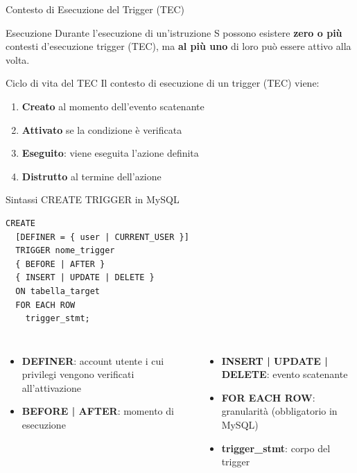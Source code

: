 \documentclass[aspectratio=169]{beamer}
\begin{document}
\begin{frame}{Contesto di Esecuzione del Trigger (TEC)}
  \begin{block}{Esecuzione}
    Durante l'esecuzione di un'istruzione S possono esistere \textbf{zero o più}
    contesti d'esecuzione trigger (TEC), ma \textbf{al più uno} di loro può
    essere attivo alla volta.
  \end{block}
  \vspace{0.3cm}
  \begin{block}{Ciclo di vita del TEC}
    Il contesto di esecuzione di un trigger (TEC) viene:
    \begin{enumerate}
      \item \textbf{Creato} al momento dell'evento scatenante
      \item \textbf{Attivato} se la condizione è verificata
      \item \textbf{Eseguito}: viene eseguita l'azione definita
      \item \textbf{Distrutto} al termine dell'azione
    \end{enumerate}
  \end{block}
\end{frame}

\begin{frame}[fragile]{Sintassi CREATE TRIGGER in MySQL}
  \begin{lstlisting}[style=sqlstyle]
CREATE
  [DEFINER = { user | CURRENT_USER }]
  TRIGGER nome_trigger
  { BEFORE | AFTER }
  { INSERT | UPDATE | DELETE }
  ON tabella_target
  FOR EACH ROW
    trigger_stmt;
  \end{lstlisting}
  \vspace{0.2cm}
  \begin{columns}[T]
      \begin{itemize}
        \item \textbf{DEFINER}: account utente i cui privilegi vengono
              verificati all'attivazione
        \item \textbf{BEFORE | AFTER}: momento di esecuzione
      \end{itemize}
      \begin{itemize}
        \item \textbf{INSERT | UPDATE | DELETE}: evento scatenante
        \item \textbf{FOR EACH ROW}: granularità (obbligatorio in MySQL)
        \item \textbf{trigger\_stmt}: corpo del trigger
      \end{itemize}
  \end{columns}
\end{frame}
\end{document}
